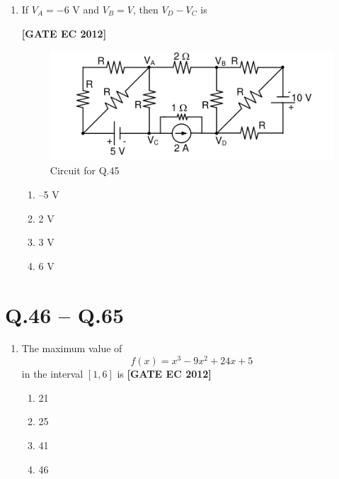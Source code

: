 \documentclass[12pt]{article}
\begin{document}
\begin{enumerate}[leftmargin=1.0em, label=\textbf{Q.\arabic*.}, itemsep=2em]
\begin{enumerate}[leftmargin=2.5em, label=\textbf{Q.\arabic*.}, itemsep=2em, start=26]
\item If $V_A = -6$ V and $V_B = V$, then $V_D - V_C$ is

\noindent \textbf{[GATE EC 2012]}
\begin{figure}[H]\centering
\includegraphics[width=0.5\columnwidth]{figs/q45.png}
\caption{Circuit for Q.45}
\label{fig:q45}
\end{figure}
\begin{multicols}{2}
    \begin{enumerate}
        \item –5 V
        \item 2 V
        \item 3 V
        \item 6 V
    \end{enumerate}
\end{multicols}


\end{enumerate}

\newpage
\section*{Q.46 -- Q.65}
\begin{enumerate}[leftmargin=2.5em, label=\textbf{Q.\arabic*.}, itemsep=2em, start=46]

\item The maximum value of
\[
f(x) = x^{3} - 9x^{2} + 24x + 5
\]
in the interval $[1,6]$ is
\noindent \textbf{[GATE EC 2012]}
\begin{multicols}{2}
    \begin{enumerate}[label=\alph*.]
        \item 21
        \item 25
        \item 41
        \item 46
    \end{enumerate}
\end{multicols}


\end{enumerate}
\end{enumerate}
\end{document}
